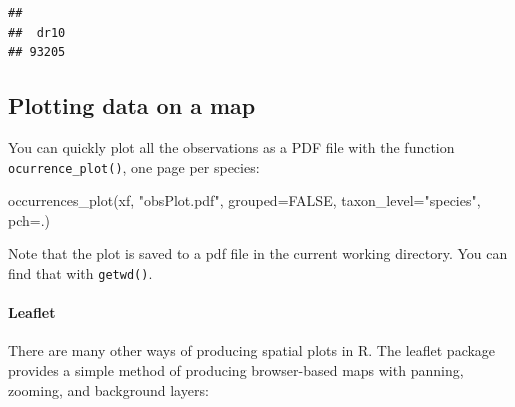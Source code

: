 \documentclass[
  10pt,
]{article}
\newenvironment{Shaded}{\begin{snugshade}}{\end{snugshade}}
\newcommand{\AttributeTok}[1]{\textcolor[rgb]{0.77,0.63,0.00}{#1}}
\newcommand{\ConstantTok}[1]{\textcolor[rgb]{0.00,0.00,0.00}{#1}}
\newcommand{\FunctionTok}[1]{\textcolor[rgb]{0.00,0.00,0.00}{#1}}
\newcommand{\NormalTok}[1]{#1}
\newcommand{\StringTok}[1]{\textcolor[rgb]{0.31,0.60,0.02}{#1}}
\begin{document}
\begin{verbatim}
## 
##  dr10 
## 93205
\end{verbatim}

\hypertarget{plotting-data-on-a-map}{%
\subsection{Plotting data on a map}\label{plotting-data-on-a-map}}

You can quickly plot all the observations as a PDF file with the function \texttt{ocurrence\_plot()}, one page per species:

\begin{Shaded}
\begin{Highlighting}[]
\FunctionTok{occurrences\_plot}\NormalTok{(xf, }\StringTok{"obsPlot.pdf"}\NormalTok{, }
                 \AttributeTok{grouped=}\ConstantTok{FALSE}\NormalTok{, }
                 \AttributeTok{taxon\_level=}\StringTok{"species"}\NormalTok{, }
                 \AttributeTok{pch=}\StringTok{\textquotesingle{}.\textquotesingle{}}\NormalTok{)}
\end{Highlighting}
\end{Shaded}

Note that the plot is saved to a pdf file in the current working directory. You can find that with \texttt{getwd()}.

\hypertarget{leaflet}{%
\paragraph{Leaflet}\label{leaflet}}

There are many other ways of producing spatial plots in R. The leaflet package provides a simple method of producing browser-based maps with panning, zooming, and background layers:
\end{document}
